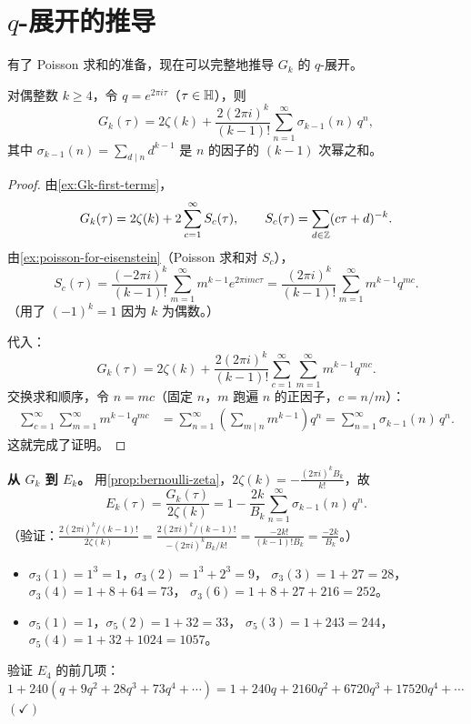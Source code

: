 \section{$q$-展开的推导}
\label{sec:eisenstein-q-expansion}

有了 Poisson 求和的准备，现在可以完整地推导 $G_k$ 的 $q$-展开。



\begin{theorem}[$G_k$ 的 $q$-展开]
\label{thm:Gk-q-expansion}
对偶整数 $k \geq 4$，令 $q = e^{2\pi i\tau}$（$\tau \in \mathbb{H}$），则
\[
  G_k(\tau) = 2\zeta(k)
  + \frac{2(2\pi i)^k}{(k-1)!} \sum_{n=1}^{\infty} \sigma_{k-1}(n)\, q^n,
\]
其中 $\sigma_{k-1}(n) = \sum_{d \mid n} d^{k-1}$ 是 $n$ 的因子的 $(k-1)$ 次幂之和。
\end{theorem}

\begin{proof}
由\cref{ex:Gk-first-terms}，
\[
  G_k(\tau) = 2\zeta(k) + 2\sum_{c=1}^{\infty} S_c(\tau),
  \qquad S_c(\tau) = \sum_{d \in \mathbb{Z}} (c\tau + d)^{-k}.
\]
由\cref{ex:poisson-for-eisenstein}（Poisson 求和对 $S_c$），
\[
  S_c(\tau) = \frac{(-2\pi i)^k}{(k-1)!} \sum_{m=1}^{\infty} m^{k-1} e^{2\pi i mc\tau}
  = \frac{(2\pi i)^k}{(k-1)!} \sum_{m=1}^{\infty} m^{k-1} q^{mc}.
\]
（用了 $(-1)^k = 1$ 因为 $k$ 为偶数。）

代入：
\[
  G_k(\tau)
  = 2\zeta(k) + \frac{2(2\pi i)^k}{(k-1)!}
    \sum_{c=1}^{\infty} \sum_{m=1}^{\infty} m^{k-1} q^{mc}.
\]
交换求和顺序，令 $n = mc$（固定 $n$，$m$ 跑遍 $n$ 的正因子，$c = n/m$）：
\begin{align}
  \sum_{c=1}^{\infty} \sum_{m=1}^{\infty} m^{k-1} q^{mc}
  &= \sum_{n=1}^{\infty} \left(\sum_{m \mid n} m^{k-1}\right) q^n
  = \sum_{n=1}^{\infty} \sigma_{k-1}(n)\, q^n.
\end{align}
这就完成了证明。
\end{proof}

\textbf{从 $G_k$ 到 $E_k$。}
用\cref{prop:bernoulli-zeta}，$2\zeta(k) = -\frac{(2\pi i)^k B_k}{k!}$，故
\[
  E_k(\tau)
  = \frac{G_k(\tau)}{2\zeta(k)}
  = 1 - \frac{2k}{B_k} \sum_{n=1}^{\infty} \sigma_{k-1}(n)\, q^n.
\]
（验证：$\frac{2(2\pi i)^k/(k-1)!}{2\zeta(k)} = \frac{2(2\pi i)^k/(k-1)!}{-(2\pi i)^k B_k/k!}
= \frac{-2k!}{(k-1)! B_k} = \frac{-2k}{B_k}$。）

\begin{example}
\label{ex:sigma-computation}
\leavevmode
\begin{itemize}
  \item $\sigma_3(1) = 1^3 = 1$，$\sigma_3(2) = 1^3 + 2^3 = 9$，
    $\sigma_3(3) = 1 + 27 = 28$，$\sigma_3(4) = 1 + 8 + 64 = 73$，
    $\sigma_3(6) = 1 + 8 + 27 + 216 = 252$。
  \item $\sigma_5(1) = 1$，$\sigma_5(2) = 1 + 32 = 33$，
    $\sigma_5(3) = 1 + 243 = 244$，$\sigma_5(4) = 1 + 32 + 1024 = 1057$。
\end{itemize}

验证 $E_4$ 的前几项：
$1 + 240(q + 9q^2 + 28q^3 + 73q^4 + \cdots)
= 1 + 240q + 2160q^2 + 6720q^3 + 17520q^4 + \cdots$ \quad $(\checkmark)$
\end{example}

